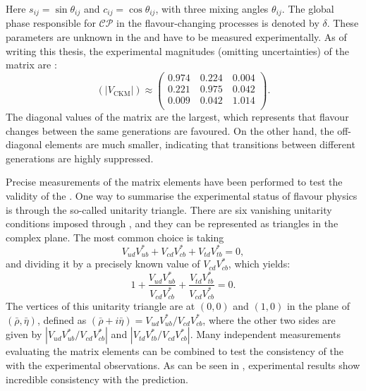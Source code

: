 Here $s_{ij}=\sin\theta_{ij}$ and $c_{ij}=\cos\theta_{ij}$, with three mixing angles $\theta_{ij}$.
The global phase responsible for $\mathcal{CP}$ in the flavour-changing processes is denoted by $\delta$.
These parameters are unknown in the \SM and have to be measured experimentally.
As of writing this thesis, the experimental magnitudes (omitting uncertainties) of the \CKM matrix are \cite{Workman:2022ynf}:
\begin{equation}
    (|V_{\mathrm{CKM}}|) \approx 
    \begin{pmatrix}
        0.974 \quad 0.224 \quad 0.004\\
        0.221 \quad 0.975 \quad 0.042\\
        0.009 \quad 0.042 \quad 1.014\\
    \end{pmatrix}.
\end{equation}
The diagonal values of the \CKM matrix are the largest, which represents that flavour changes between the same generations are favoured.
On the other hand, the off-diagonal elements are much smaller, indicating that transitions between different generations are highly suppressed.

Precise measurements of the \CKM matrix elements have been performed to test the validity of the \SM.
One way to summarise the experimental status of flavour physics is through the so-called unitarity triangle.
There are six vanishing unitarity conditions imposed through , and they can be represented as triangles in the complex plane.
The most common choice is taking
\begin{equation}
    V^{}_{ud}V_{ub}^* + V^{}_{cd}V^*_{cb} + V^{}_{td}V_{tb}^* =0,
\end{equation}
and dividing it by a precisely known value of $V^{}_{cd}V^*_{cb}$, which yields:
\begin{equation}
    1+\frac{V^{}_{ud}V_{ub}^*}{V^{}_{cd}V_{cb}^*}+\frac{V^{}_{td}V_{tb}^*}{V^{}_{cd}V_{cb}^*} = 0.
\end{equation}
The vertices of this unitarity triangle are at $(0,0)$ and $(1,0)$ in the plane of $(\bar{\rho},\bar{\eta})$, defined as $(\bar{\rho}+i\bar{\eta})=V^{}_{ud}V_{ub}^*/V^{}_{cd}V_{cb}^*$,
where the other two sides are given by $|V^{}_{ud}V_{ub}^*/V^{}_{cd}V_{cb}^*|$ and $|V^{}_{td}V_{tb}^*/V^{}_{cd}V_{cb}^*|$.
Many independent measurements evaluating the \CKM matrix elements can be combined to test the consistency of the \SM with the experimental observations.
As can be seen in , experimental results show incredible consistency with the \SM prediction.

